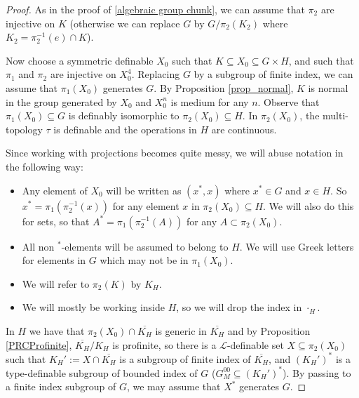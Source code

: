 \documentclass[12pt]{article}
\theoremstyle{definition}
\theoremstyle{mystyle}
\theoremstyle{remark}
\newcommand{\LC}{\mathcal{L}}
\begin{document}
\begin{proof}
\begin{comment}
\bigskip
\end{comment}

As in the proof of \ref{algebraic group chunk}, we can assume that $\pi_2$ are injective on $K$ (otherwise
we can replace $G$ by $G/\pi_2(K_2)$ where $K_2 = \pi_2^{-1}(e)\cap K$).


Now choose a symmetric definable $X_0$ such that $K \subseteq X_0
\subseteq G\times H$, and  such that $\pi_1$ and $\pi_2$ are
injective on $X_0^4$. Replacing $G$ by a subgroup of finite index,
we can assume that $\pi_1(X_0)$ generates $G$. By Proposition \ref{prop_normal}, $K$ is normal in the group
generated by $X_0$ and $X_0^n$ is medium for any $n$. Observe
that $\pi_1(X_0)\subseteq G$ is definably isomorphic to
$\pi_2(X_0)\subseteq H$.
In $\pi_2(X_0)$, the multi-topology $\tau$ is definable and the operations in $H$ are continuous.


Since working with projections becomes quite messy, we will abuse notation in the following way:

\begin{itemize}
\item Any element of $X_0$ will be written as $(x^*, x)$ where
$x^*\in G$ and $x\in H$. So $x^*=\pi_1(\pi_2^{-1}(x))$ for any
element $x$ in $\pi_2(X_0)\subseteq H$. We will also do this for
sets, so that $A^*=\pi_1(\pi_2^{-1}(A))$ for any $A\subset
\pi_2(X_0)$.

\item All non $^*$-elements will be assumed to belong to $H$. We
will use Greek letters for elements in $G$ which may not be in
$\pi_1(X_0)$.

\item We will refer to $\pi_2(K)$ by $K_H$.

\item We will mostly be working inside $H$, so we will drop the
index in $\cdot_H$.

\end{itemize}

\bigskip

In $H$ we have that $\pi_2(X_0) \cap \overline{K_H}$ is generic in
$\overline{K_H}$ and by Proposition \ref{PRCProfinite},
$\overline{K_H}/K_H$ is profinite, so there is a $\LC$-definable
set $X \subseteq \pi_2(X_0)$  such that $K_H':= X \cap
\overline{K_H}$ is a subgroup of finite index  of
$\overline{K_H}$, and $(K_H')^*$ is a type-definable subgroup of
bounded index of $G$ ($G^{00}_M \subseteq (K_H')^*$). By passing
to a finite index subgroup of $G$, we may assume that $X^*$
generates $G$.


\end{proof}
\end{document}
